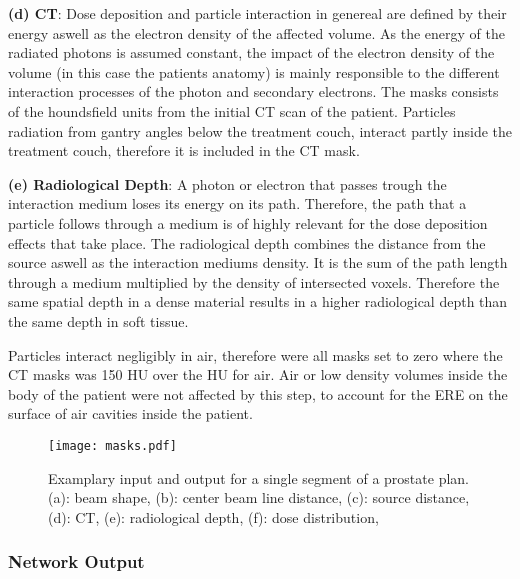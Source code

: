 \begin{hangingpar}
    \item \textbf{(d) CT}: Dose deposition and particle interaction in genereal are defined by their energy aswell as the electron density of the affected volume. As the energy of the radiated photons is assumed constant, the impact of the electron density of the volume (in this case the patients anatomy) is mainly responsible to the different interaction processes of the photon and secondary electrons. The masks consists of the houndsfield units from the initial CT scan of the patient. Particles radiation from gantry angles below the treatment couch, interact partly inside the treatment couch, therefore it is included in the CT mask. 
\end{hangingpar}

\begin{hangingpar}
    \item \textbf{(e) Radiological Depth}: A photon or electron that passes trough the interaction medium loses its energy on its path. Therefore, the path that a particle follows through a medium is of highly relevant for the dose deposition effects that take place. The radiological depth combines the distance from the source aswell as the interaction mediums density. It is the sum of the path length through a medium multiplied by the density of intersected voxels. Therefore the same spatial depth in a dense material results in a higher radiological depth than the same depth in soft tissue.
\end{hangingpar}

Particles interact negligibly in air, therefore were all masks set to zero where the CT masks was 150 HU over the HU for air. Air or low density volumes inside the body of the patient were not affected by this step, to account for the \ac{ERE} on the surface of air cavities inside the patient. 

\begin{figure}
    \centering
    \texttt{[image: masks.pdf]}
    \caption{Examplary input and output for a single segment of a prostate plan. (a): beam shape, (b): center beam line distance, (c): source distance, (d): CT, (e): radiological depth, (f): dose distribution, }\label{fig:masks}
\end{figure}

\subsubsection{Network Output}

